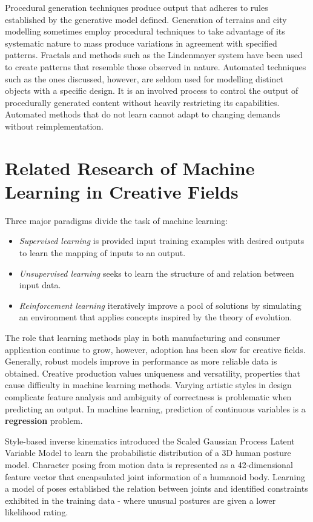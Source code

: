 \documentclass[ %
author={Dillon Keith Diep},
supervisor={Dr. Carl Henrik Ek},
degree={MEng},
title={ART-CG:},
subtitle={Assisted Real-time Content Generation of 3D Hair by Learning Manifolds},
type={Research},
year={2017} ]{dissertation}
\begin{document}
Procedural generation techniques produce output that adheres to rules established by the generative model defined. Generation of terrains and city modelling sometimes employ procedural techniques to take advantage of its systematic nature to mass produce variations in agreement with specified patterns\cite{procedural1}. Fractals and methods such as the Lindenmayer system have been used to create patterns that resemble those observed in nature\cite{lsystem}. Automated techniques such as the ones discussed, however, are seldom used for modelling distinct objects with a specific design. It is an involved process to control the output of procedurally generated content without heavily restricting its capabilities. Automated methods that do not learn cannot adapt to changing demands without reimplementation.

\section{Related Research of Machine Learning in Creative Fields}
Three major paradigms divide the task of machine learning:
\begin{itemize}
	\item \textit{Supervised learning} is provided input training examples with desired outputs to learn the mapping of inputs to an output.
	\item \textit{Unsupervised learning} seeks to learn the structure of and relation between input data.
	\item \textit{Reinforcement learning} iteratively improve a pool of solutions by simulating an environment that applies concepts inspired by the theory of evolution.
\end{itemize}
The role that learning methods play in both manufacturing and consumer application continue to grow, however, adoption has been slow for creative fields.  Generally, robust models improve in performance as more reliable data is obtained. Creative production values uniqueness and versatility, properties that cause difficulty in machine learning methods. Varying artistic styles in design complicate feature analysis and ambiguity of correctness is problematic when predicting an output. In machine learning, prediction of continuous variables is a \textbf{regression} problem. 

Style-based inverse kinematics introduced the Scaled Gaussian Process Latent Variable Model to learn the probabilistic distribution of a 3D human posture model\cite{styleik}. Character posing from motion data is represented as a 42-dimensional feature vector that encapsulated joint information of a humanoid body. Learning a model of poses established the relation between joints and identified constraints exhibited in the training data - where unusual postures are given a lower likelihood rating.
\end{document}
